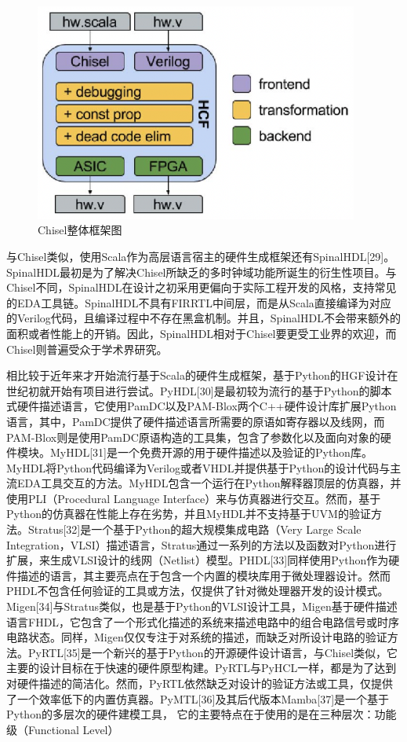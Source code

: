 \begin{figure}[htbp]
	\centering
	\includegraphics[width=0.95\textwidth]{Photos/chisel.png}
	\caption{Chisel整体框架图}
\end{figure}

与Chisel类似，使用Scala作为高层语言宿主的硬件生成框架还有SpinalHDL[29]。SpinalHDL最初是为了解决Chisel所缺乏的多时钟域功能所诞生的衍生性项目。与Chisel不同，SpinalHDL在设计之初采用更偏向于实际工程开发的风格，支持常见的EDA工具链。SpinalHDL不具有FIRRTL中间层，而是从Scala直接编译为对应的Verilog代码，且编译过程中不存在黑盒机制。并且，SpinalHDL不会带来额外的面积或者性能上的开销。因此，SpinalHDL相对于Chisel要更受工业界的欢迎，而Chisel则普遍受众于学术界研究。

相比较于近年来才开始流行基于Scala的硬件生成框架，基于Python的HGF设计在世纪初就开始有项目进行尝试。PyHDL[30]是最初较为流行的基于Python的脚本式硬件描述语言，它使用PamDC以及PAM-Blox两个C++硬件设计库扩展Python语言，其中，PamDC提供了硬件描述语言所需要的原语如寄存器以及线网，而PAM-Blox则是使用PamDC原语构造的工具集，包含了参数化以及面向对象的硬件模块。MyHDL[31]是一个免费开源的用于硬件描述以及验证的Python库。MyHDL将Python代码编译为Verilog或者VHDL并提供基于Python的设计代码与主流EDA工具交互的方法。MyHDL包含一个运行在Python解释器顶层的仿真器，并使用PLI（Procedural Language Interface）来与仿真器进行交互。然而，基于Python的仿真器在性能上存在劣势，并且MyHDL并不支持基于UVM的验证方法。Stratus[32]是一个基于Python的超大规模集成电路（Very Large Scale Integration，VLSI）描述语言，Stratus通过一系列的方法以及函数对Python进行扩展，来生成VLSI设计的线网（Netlist）模型。PHDL[33]同样使用Python作为硬件描述的语言，其主要亮点在于包含一个内置的模块库用于微处理器设计。然而PHDL不包含任何验证的工具或方法，仅提供了针对微处理器开发的设计模式。Migen[34]与Stratus类似，也是基于Python的VLSI设计工具，Migen基于硬件描述语言FHDL，它包含了一个形式化描述的系统来描述电路中的组合电路信号或时序电路状态。同样，Migen仅仅专注于对系统的描述，而缺乏对所设计电路的验证方法。PyRTL[35]是一个新兴的基于Python的开源硬件设计语言，与Chisel类似，它主要的设计目标在于快速的硬件原型构建。PyRTL与PyHCL一样，都是为了达到对硬件描述的简洁化。然而，PyRTL依然缺乏对设计的验证方法或工具，仅提供了一个效率低下的内置仿真器。PyMTL[36]及其后代版本Mamba[37]是一个基于Python的多层次的硬件建模工具， 它的主要特点在于使用的是在三种层次：功能级（Functional Level）

